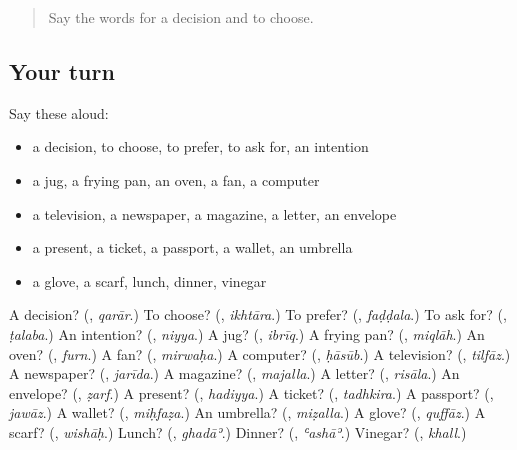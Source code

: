 \label{lesson:AR-R119-second-pass-things-in-the-house}



\begin{quote}
Say the words for a decision and to choose.
\end{quote}

\subsection*{Your turn}
Say these aloud:

\begin{itemize}
\raggedright
  \item a decision, to choose, to prefer, to ask for, an intention
  \item a jug, a frying pan, an oven, a fan, a computer
  \item a television, a newspaper, a magazine, a letter, an envelope
  \item a present, a ticket, a passport, a wallet, an umbrella
  \item a glove, a scarf, lunch, dinner, vinegar
\end{itemize}

\begin{tcolorbox}[breakable,colback=teal!4,colframe=teal!35!black,title={Before you move on}]
A decision? (\textbf{}, \emph{qarār}.) To choose? (\textbf{}, \emph{ikhtāra}.) To prefer? (\textbf{}, \emph{faḍḍala}.) To ask for? (\textbf{}, \emph{ṭalaba}.) An intention? (\textbf{}, \emph{niyya}.) A jug? (\textbf{}, \emph{ibrīq}.) A frying pan? (\textbf{}, \emph{miqlāh}.) An oven? (\textbf{}, \emph{furn}.) A fan? (\textbf{}, \emph{mirwaḥa}.) A computer? (\textbf{}, \emph{ḥāsūb}.) A television? (\textbf{}, \emph{tilfāz}.) A newspaper? (\textbf{}, \emph{jarīda}.) A magazine? (\textbf{}, \emph{majalla}.) A letter? (\textbf{}, \emph{risāla}.) An envelope? (\textbf{}, \emph{ẓarf}.) A present? (\textbf{}, \emph{hadiyya}.) A ticket? (\textbf{}, \emph{tadhkira}.) A passport? (\textbf{}, \emph{jawāz}.) A wallet? (\textbf{}, \emph{miḥfaẓa}.) An umbrella? (\textbf{}, \emph{miẓalla}.) A glove? (\textbf{}, \emph{quffāz}.) A scarf? (\textbf{}, \emph{wishāḥ}.) Lunch? (\textbf{}, \emph{ghadāʾ}.) Dinner? (\textbf{}, \emph{ʿashāʾ}.) Vinegar? (\textbf{}, \emph{khall}.)
\end{tcolorbox}
